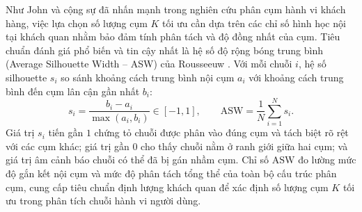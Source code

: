 \documentclass[../LuanVan.tex]{subfiles}
\begin{document}
Như John và cộng sự \cite{john2023exploration} đã nhấn mạnh trong nghiên cứu phân cụm hành vi khách hàng, việc lựa chọn số lượng cụm $K$ tối ưu cần dựa trên các chỉ số hình học nội tại khách quan nhằm bảo đảm tính phân tách và độ đồng nhất của cụm. Tiêu chuẩn đánh giá phổ biến và tin cậy nhất là hệ số độ rộng bóng trung bình (Average Silhouette Width -- ASW) của Rousseeuw \cite{rousseeuw1987silhouettes}. Với mỗi chuỗi $i$, hệ số silhouette $s_i$ so sánh khoảng cách trung bình nội cụm $a_i$ với khoảng cách trung bình đến cụm lân cận gần nhất $b_i$:
\begin{equation}
    s_i = \frac{b_i - a_i}{\max(a_i, b_i)} \in [-1, 1],
    \qquad \mathrm{ASW} = \frac{1}{N}\sum_{i=1}^{N} s_i.
    \label{eq:silhouette_theory}
\end{equation}
Giá trị $s_i$ tiến gần $1$ chứng tỏ chuỗi được phân vào đúng cụm và tách biệt rõ rệt với các cụm khác; giá trị gần $0$ cho thấy chuỗi nằm ở ranh giới giữa hai cụm; và giá trị âm cảnh báo chuỗi có thể đã bị gán nhầm cụm. Chỉ số $\mathrm{ASW}$ đo lường mức độ gắn kết nội cụm và mức độ phân tách tổng thể của toàn bộ cấu trúc phân cụm, cung cấp tiêu chuẩn định lượng khách quan để xác định số lượng cụm $K$ tối ưu trong phân tích chuỗi hành vi người dùng.
\end{document}
